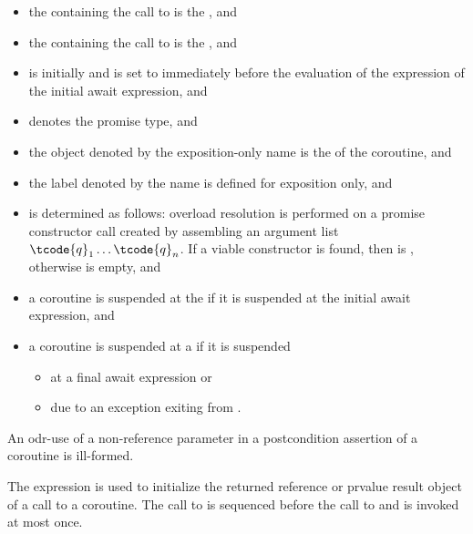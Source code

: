 \begin{itemize}
\item
{}%
the  containing
the call to 
is the , and
\item
the  containing
the call to 
is the , and
\item
{}
is initially  and is set to 
immediately before the evaluation
of the  expression
of the initial await expression, and
\item
{} denotes the promise type, and
\item
the object denoted by the exposition-only name 
is the  of the coroutine, and
\item
the label denoted by the name 
is defined for exposition only, and
\item
{} is determined as follows:
overload resolution is performed on a promise constructor call created by
assembling an argument list $\tcode{q}_1 \dotsc \tcode{q}_n$. If a viable
constructor is found, then
 is
, otherwise
 is empty, and
\item
a coroutine is suspended at the  if
it is suspended at the initial await expression, and
\item
a coroutine is suspended at a  if
it is suspended
\begin{itemize}
\item
at a final await expression or
\item
due to an exception exiting from .
\end{itemize}
\end{itemize}

\pnum
\begin{note}
An odr-use of a non-reference parameter
in a postcondition assertion
of a coroutine is ill-formed.
\end{note}

\pnum
The expression  is used
to initialize
the returned reference or prvalue result object of a call to a coroutine.
The call to 
is sequenced before
the call to 
and is invoked at most once.

